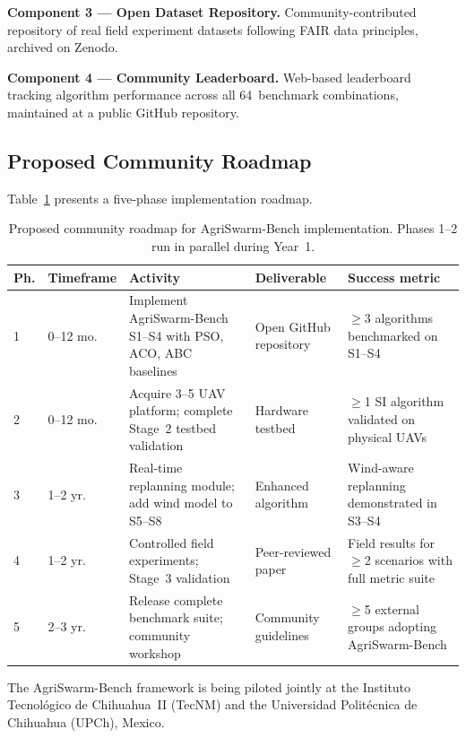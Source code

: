 \documentclass[review,3p]{elsarticle}
\begin{document}
\textbf{Component 3 --- Open Dataset Repository.} Community-contributed repository of real field experiment datasets following FAIR data principles, archived on Zenodo.

\textbf{Component 4 --- Community Leaderboard.} Web-based leaderboard tracking algorithm performance across all 64~benchmark combinations, maintained at a public GitHub repository.

\subsection{Proposed Community Roadmap}
\label{subsec:roadmap}

Table~\ref{tab:roadmap} presents a five-phase implementation roadmap.

\begin{table}[htbp]
\centering
\caption{Proposed community roadmap for AgriSwarm-Bench implementation.
Phases 1--2 run in parallel during Year~1.}
\label{tab:roadmap}
\begin{tabularx}{\textwidth}{ll>{\raggedright\arraybackslash}Xl>{\raggedright\arraybackslash}X}
\toprule
\textbf{Ph.} & \textbf{Timeframe} & \textbf{Activity} & \textbf{Deliverable} & \textbf{Success metric} \\
\midrule
1 & 0--12 mo. & Implement AgriSwarm-Bench S1--S4 with PSO, ACO, ABC baselines & Open GitHub repository & $\geq$3 algorithms benchmarked on S1--S4 \tabularnewline
2 & 0--12 mo. & Acquire 3--5 UAV platform; complete Stage~2 testbed validation  & Hardware testbed       & $\geq$1 SI algorithm validated on physical UAVs \tabularnewline
3 & 1--2 yr.  & Real-time replanning module; add wind model to S5--S8           & Enhanced algorithm     & Wind-aware replanning demonstrated in S3--S4 \tabularnewline
4 & 1--2 yr.  & Controlled field experiments; Stage~3 validation               & Peer-reviewed paper    & Field results for $\geq$2 scenarios with full metric suite \tabularnewline
5 & 2--3 yr.  & Release complete benchmark suite; community workshop            & Community guidelines   & $\geq$5 external groups adopting AgriSwarm-Bench \tabularnewline
\bottomrule
\end{tabularx}
\end{table}

The AgriSwarm-Bench framework is being piloted jointly at the Instituto
Tecnológico de Chihuahua~II (TecNM) and the Universidad Politécnica de
Chihuahua (UPCh), Mexico.


\end{document}

